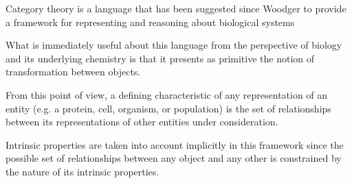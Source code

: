 \begin{frame}
\begin{block}{}
Category theory \cite{Lane1985,Lane1998,MacLane1992,Lawvere1997,Lawvere2003,Awodey2006} is a language that has been suggested since Woodger to provide a framework for representing and reasoning about biological systems \cite{Rashevsky1954,Rosen1958,Rosen1958a,Rosen1978,GOGUEN1979,Rosen1985,Rosen1991,Ehresmann2007,Louie2009} 
\end{block}
\begin{block}{}
What is immediately useful about this language from the perspective of biology and its underlying chemistry is that it presents as primitive the notion of transformation between objects. 
\end{block}
\begin{block}{}
From this point of view, a defining characteristic of any representation of an entity (e.g. a protein, cell, organism, or population) is the set of relationships between its representations of other entities under consideration. 
\end{block}
\begin{block}{}
Intrinsic properties are taken into account implicitly in this framework since the possible set of relationships between any object and any other is constrained by the nature of its intrinsic properties. 
\end{block}
\end{frame}
